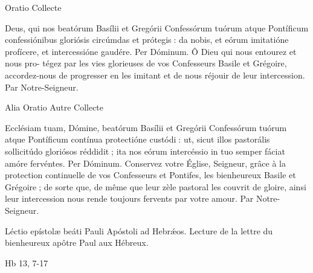 \begin{paracol}{2}
Oratio
\switchcolumn
Collecte
\switchcolumn*

Deus, qui nos beatórum Basílii et  Gregórii Confessórum tuórum atque Pontíficum confessiónibus gloriósis circúmdas et prótegis : da nobis, et eórum imitatióne profícere, et intercessióne gaudére. Per Dóminum.
\switchcolumn
Ô Dieu qui nous entourez et nous pro- tégez par les vies glorieuses de vos Confesseurs Basile et Grégoire, accordez-nous de progresser en les imitant et de nous réjouir de leur intercession. Par Notre-Seigneur.
\switchcolumn*

Alia Oratio
\switchcolumn
Autre Collecte
\switchcolumn*

Ecclésiam tuam, Dómine, beatórum Basílii et Gregórii Confessórum tuórum atque Pontíficum contínua protectióne custódi : ut, sicut illos pastorális sollicitúdo gloriósos réddidit ; ita nos eórum intercéssio in tuo semper fáciat amóre fervéntes. Per Dóminum.
\switchcolumn
Conservez votre Église, Seigneur, grâce à la protection continuelle de vos Confesseurs et Pontifes, les bienheureux Basile et Grégoire ; de sorte que, de même que leur zèle pastoral les couvrit de gloire, ainsi leur intercession nous rende toujours fervents par votre amour. Par Notre-Seigneur.
\switchcolumn*

Léctio epístolæ beáti Pauli Apóstoli ad Hebrǽos.
\switchcolumn
Lecture de la lettre du bienheureux apôtre Paul aux Hébreux.
\switchcolumn*

Hb 13, 7-17
\switchcolumn

\switchcolumn*


\end{paracol}

